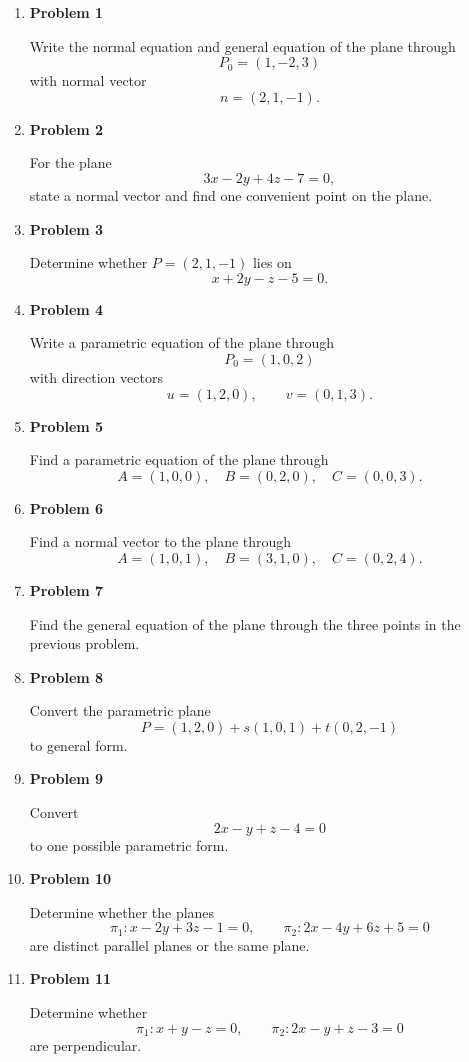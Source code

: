 \begin{enumerate}
\item \textbf{Problem 1}\par
Write the normal equation and general equation of the plane through
\[
P_0=(1,-2,3)
\]
with normal vector
\[
n=(2,1,-1).
\]

\item \textbf{Problem 2}\par
For the plane
\[
3x-2y+4z-7=0,
\]
state a normal vector and find one convenient point on the plane.

\item \textbf{Problem 3}\par
Determine whether \(P=(2,1,-1)\) lies on
\[
x+2y-z-5=0.
\]

\item \textbf{Problem 4}\par
Write a parametric equation of the plane through
\[
P_0=(1,0,2)
\]
with direction vectors
\[
u=(1,2,0),
\qquad
v=(0,1,3).
\]

\item \textbf{Problem 5}\par
Find a parametric equation of the plane through
\[
A=(1,0,0),\quad B=(0,2,0),\quad C=(0,0,3).
\]

\item \textbf{Problem 6}\par
Find a normal vector to the plane through
\[
A=(1,0,1),\quad B=(3,1,0),\quad C=(0,2,4).
\]

\item \textbf{Problem 7}\par
Find the general equation of the plane through the three points in the previous problem.

\item \textbf{Problem 8}\par
Convert the parametric plane
\[
P=(1,2,0)+s(1,0,1)+t(0,2,-1)
\]
to general form.

\item \textbf{Problem 9}\par
Convert
\[
2x-y+z-4=0
\]
to one possible parametric form.

\item \textbf{Problem 10}\par
Determine whether the planes
\[
\pi_1:x-2y+3z-1=0,
\qquad
\pi_2:2x-4y+6z+5=0
\]
are distinct parallel planes or the same plane.

\item \textbf{Problem 11}\par
Determine whether
\[
\pi_1:x+y-z=0,
\qquad
\pi_2:2x-y+z-3=0
\]
are perpendicular.


\end{enumerate}
